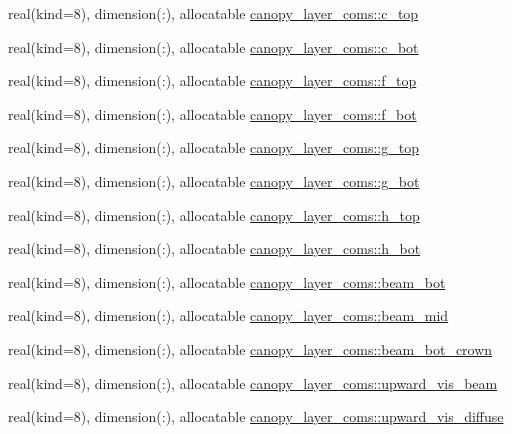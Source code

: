 \begin{DoxyCompactItemize}
\item 
real(kind=8), dimension(\+:), allocatable \hyperlink{namespacecanopy__layer__coms_a83e6e25d502c4ff6f389c2d353645e5d}{canopy\+\_\+layer\+\_\+coms\+::c\+\_\+top}
\item 
real(kind=8), dimension(\+:), allocatable \hyperlink{namespacecanopy__layer__coms_aa62cf8de84772d0d7f4985ccd01ad4c1}{canopy\+\_\+layer\+\_\+coms\+::c\+\_\+bot}
\item 
real(kind=8), dimension(\+:), allocatable \hyperlink{namespacecanopy__layer__coms_af3758ee93625e45577879452859992c8}{canopy\+\_\+layer\+\_\+coms\+::f\+\_\+top}
\item 
real(kind=8), dimension(\+:), allocatable \hyperlink{namespacecanopy__layer__coms_aa613df56338fc4f6a370134511c4bb50}{canopy\+\_\+layer\+\_\+coms\+::f\+\_\+bot}
\item 
real(kind=8), dimension(\+:), allocatable \hyperlink{namespacecanopy__layer__coms_aa7fbffea9917d60f4c6ca5262222c69a}{canopy\+\_\+layer\+\_\+coms\+::g\+\_\+top}
\item 
real(kind=8), dimension(\+:), allocatable \hyperlink{namespacecanopy__layer__coms_a29c0519f56906b6f06da139fc1ba16ec}{canopy\+\_\+layer\+\_\+coms\+::g\+\_\+bot}
\item 
real(kind=8), dimension(\+:), allocatable \hyperlink{namespacecanopy__layer__coms_a16fa644c3a2ec33a530019e5b5caf16c}{canopy\+\_\+layer\+\_\+coms\+::h\+\_\+top}
\item 
real(kind=8), dimension(\+:), allocatable \hyperlink{namespacecanopy__layer__coms_a0d074763380f49037306d0846a05a072}{canopy\+\_\+layer\+\_\+coms\+::h\+\_\+bot}
\item 
real(kind=8), dimension(\+:), allocatable \hyperlink{namespacecanopy__layer__coms_ac615341c5a6730cb3d29b27ed4109313}{canopy\+\_\+layer\+\_\+coms\+::beam\+\_\+bot}
\item 
real(kind=8), dimension(\+:), allocatable \hyperlink{namespacecanopy__layer__coms_a3e967ac0256075263e0833a70ec74b48}{canopy\+\_\+layer\+\_\+coms\+::beam\+\_\+mid}
\item 
real(kind=8), dimension(\+:), allocatable \hyperlink{namespacecanopy__layer__coms_a5930f10d661ed6a082683d2ab86f3d87}{canopy\+\_\+layer\+\_\+coms\+::beam\+\_\+bot\+\_\+crown}
\item 
real(kind=8), dimension(\+:), allocatable \hyperlink{namespacecanopy__layer__coms_af2f13bc441f2087ceba83cde5d17e7c8}{canopy\+\_\+layer\+\_\+coms\+::upward\+\_\+vis\+\_\+beam}
\item 
real(kind=8), dimension(\+:), allocatable \hyperlink{namespacecanopy__layer__coms_a8c51c8b265b6e659631e5012541c8479}{canopy\+\_\+layer\+\_\+coms\+::upward\+\_\+vis\+\_\+diffuse}

\end{DoxyCompactItemize}
